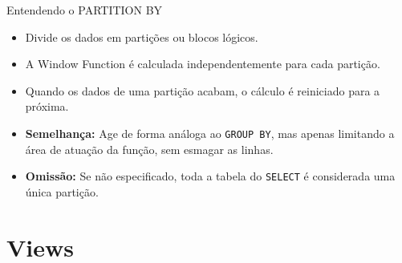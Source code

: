 \documentclass[9pt]{beamer}
\begin{document}
\begin{frame}{Entendendo o PARTITION BY}
    \begin{itemize}
        \item Divide os dados em partições ou blocos lógicos.
        \item A Window Function é calculada independentemente para cada partição.
        \item Quando os dados de uma partição acabam, o cálculo é reiniciado para a próxima.
        \item \textbf{Semelhança:} Age de forma análoga ao \texttt{GROUP BY}, mas apenas limitando a área de atuação da função, sem esmagar as linhas.
        \item \textbf{Omissão:} Se não especificado, toda a tabela do \texttt{SELECT} é considerada uma única partição.
    \end{itemize}
\end{frame}


\section{Views}
\end{document}
